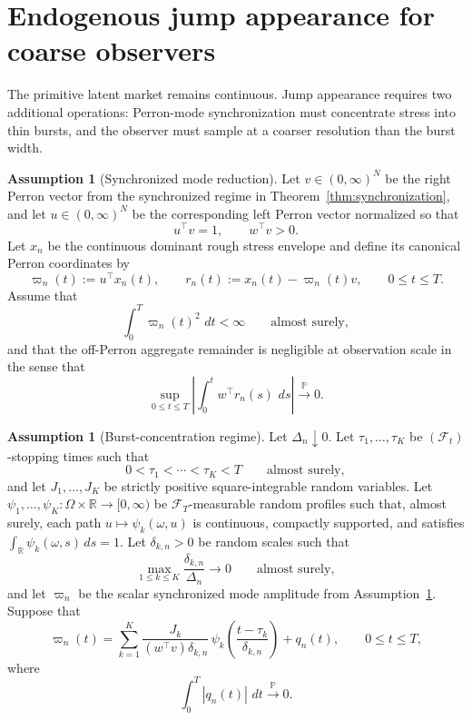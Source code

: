 \documentclass[11pt,a4paper]{amsart}
\theoremstyle{plain}
\theoremstyle{definition}
\newtheorem{assumption}[theorem]{Assumption}
\theoremstyle{remark}
\newcommand{\R}{\mathbb{R}}
\newcommand{\PP}{\mathbb{P}}
\newcommand{\dd}{\,d}
\newcommand{\toP}{\xrightarrow{\PP}}
\newcommand{\cF}{\mathcal{F}}
\begin{document}
\section{Endogenous jump appearance for coarse observers}\label{sec:jumps}

The primitive latent market remains continuous.  Jump appearance requires two additional
operations: Perron-mode synchronization must concentrate stress into thin bursts, and the observer
must sample at a coarser resolution than the burst width.

\begin{assumption}[Synchronized mode reduction]\label{ass:mode-reduction}
Let \(v\in(0,\infty)^N\) be the right Perron vector from the synchronized regime in
Theorem~\ref{thm:synchronization}, and let \(u\in(0,\infty)^N\) be the corresponding left Perron
vector normalized so that
\[
        u^\top v=1,
        \qquad
        w^\top v>0.
\]
Let \(x_n\) be the continuous dominant rough stress envelope and define its canonical Perron
coordinates by
\[
        \varpi_n(t):=u^\top x_n(t),
        \qquad
        r_n(t):=x_n(t)-\varpi_n(t)v,
        \qquad
        0\le t\le T.
\]
Assume that
\[
        \int_0^T \varpi_n(t)^2\,\dd t<\infty
        \qquad
        \text{almost surely},
\]
and that the off-Perron aggregate remainder is negligible at observation scale in the sense that
\[
        \sup_{0\le t\le T}
        \left|
        \int_0^t w^\top r_n(s)\,\dd s
        \right|
        \toP 0.
\]
\end{assumption}

\begin{assumption}[Burst-concentration regime]\label{ass:burst-concentration}
Let \(\Delta_n\downarrow0\).  Let \(\tau_1,\dots,\tau_K\) be \((\cF_t)\)-stopping times such that
\[
        0<\tau_1<\cdots<\tau_K<T
        \qquad
        \text{almost surely},
\]
and let \(J_1,\dots,J_K\) be strictly positive square-integrable random variables.  Let
\(\psi_1,\dots,\psi_K\colon\Omega\times\R\to[0,\infty)\) be \(\cF_T\)-measurable random profiles
such that, almost surely, each path \(u\mapsto \psi_k(\omega,u)\) is continuous, compactly
supported, and satisfies \(\int_{\R}\psi_k(\omega,s)\dd s=1\).  Let \(\delta_{k,n}>0\) be random
scales such that
\[
        \max_{1\le k\le K}\frac{\delta_{k,n}}{\Delta_n}\to0
        \qquad
        \text{almost surely},
\]
and let \(\varpi_n\) be the scalar synchronized mode amplitude from
Assumption~\ref{ass:mode-reduction}.  Suppose that
\[
        \varpi_n(t)
        =
        \sum_{k=1}^K
        \frac{J_k}{(w^\top v)\delta_{k,n}}\,
        \psi_k\!\left(\frac{t-\tau_k}{\delta_{k,n}}\right)
        +
        q_n(t),
        \qquad
        0\le t\le T,
\]
where
\[
        \int_0^T |q_n(t)|\,\dd t\toP0.
\]
\end{assumption}
\end{document}
